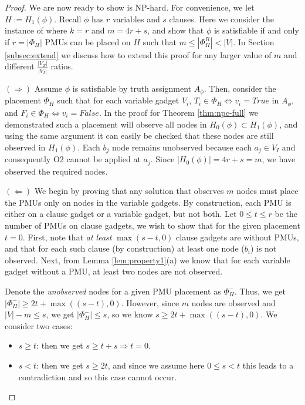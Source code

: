 \begin{proof}

We are now ready to show \maxinc is NP-hard. For convenience, we let $H := H_1(\phi)$.  Recall $\phi$ has $r$ variables and $s$ clauses. 
Here we consider the instance of \maxinc where $k=r$ and $m = 4r + s$, and show that $\phi$ is satisfiable if and only if $r=|\Phi_H|$ PMUs
can be placed on $H$ such that $m \leq |\Phi^R_{H}| < |V|$. In Section \ref{subsec:extend} we discuss how to extend this proof for any larger value of $m$ and different $\frac{|V_Z|}{|V_I|}$ ratios.

$(\Rightarrow)$ Assume $\phi$ is satisfiable by truth assignment $A_{\phi}$. Then, consider the placement $\Phi_H$ such that for each variable gadget $V_i$, $T_i\in \Phi_H \Leftrightarrow v_i=True$
in $A_\phi$, and  $F_i\in \Phi_H \Leftrightarrow v_i=False$.  In the proof for Theorem \ref{thm:npc-full} we demonstrated such a placement will observe all nodes in $H_0(\phi)\subset H_1(\phi)$, and using the same argument it can easily be checked that these nodes are still observed in $H_1(\phi)$. Each $b_j$ node remains unobserved because each $a_j \in V_I$ and consequently O2 cannot be applied at $a_j$.
Since $|H_0(\phi)|=4r+s = m$, we have observed the required nodes.

$(\Leftarrow)$
We begin by proving that any solution that observes $m$ nodes must place the PMUs only on nodes in the variable gadgets. By construction, each PMU is either on a clause gadget or a variable gadget, but not both. Let $0\leq t\leq r$ be the number of PMUs on clause gadgets, we wish to show that for the given placement $t=0$. First, note that {\em at least} $\max(s-t,0)$ clause gadgets are without PMUs, and that for each such clause (by construction) at least one node ($b_i$) is not observed. Next, from Lemma \ref{lem:property1}(a) we know that for each variable gadget without a PMU, at least two nodes are not observed.

Denote the {\em unobserved} nodes for a given PMU placement as $\Phi_H^-$. Thus, we get $|\Phi_H^-| \geq 2t + \max((s-t), 0)$. However, since $m$ nodes are observed and  $|V|-m \leq s$, we get $|\Phi_H^-| \leq s$, so we know $s \geq 2t + \max((s-t), 0)$. We consider two cases:
\begin{itemize}
	\item $s\geq t$: then we get $s \geq t + s \Rightarrow t=0.$
	\item $s < t$:	then we get $s \geq 2t$, and since we assume here $0\leq s < t$ this leads to a contradiction and so this case cannot occur.
\end{itemize}


\end{proof}
